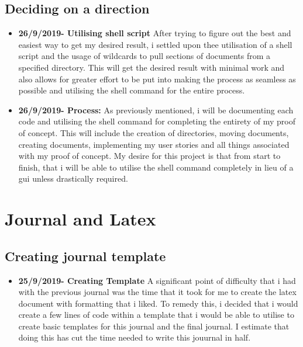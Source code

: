 \documentclass{article}
\begin{document}
\subsection{Deciding on a direction}
\begin{itemize}
\item{\textbf{26/9/2019- Utilising shell script} After trying to figure out the best and easiest way to get my desired result, i settled upon thee utilisation of a shell script and the usage of wildcards to pull sections of documents from a specified directory. This will get the desired result with minimal work and also allows for greater effort to be put into making the process as seamless as possible and utilising the shell command for the entire process.}

\item{\textbf{26/9/2019- Process:} As previously mentioned, i will be documenting each code and utilising the shell command for completing the entirety of my proof of concept. This will include the creation of directories, moving documents, creating documents, implementing my user stories and all things associated with my proof of concept. My desire for this project is that from start to finish, that i will be able to utilise the shell command completely in lieu of a gui unless drastically required.  }
\end{itemize}

\section{Journal and Latex}

\subsection{Creating journal template}
\begin{itemize}
 \item{\textbf{25/9/2019- Creating Template} A significant point of difficulty that i had with the previous journal was the time that it took for me to create the latex document with formatting that i liked. To remedy this, i decided that i would create a few lines of code within a template that i would be able to utilise to create basic templates for this journal and the final journal. I estimate that doing this has cut the time needed to write this jouurnal in half.}
 
\end{itemize}
\end{document}
